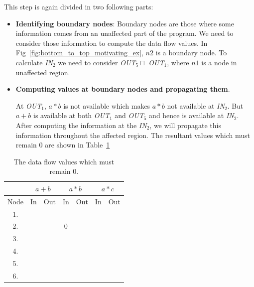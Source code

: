 \documentclass[11pt,a4paper,openright]{report}
\begin{document}
\begin{itemize}
This step is again divided in two following parts:

\begin{itemize}
\item \textbf{Identifying boundary nodes}: Boundary nodes are those where some information comes from an unaffected part of the program. We need to consider 
those information to compute the data flow values. In Fig~\ref{fig:bottom_to_top_motivating_ex}, $n2$ is a boundary node. To calculate \textit{IN}$_2$ we need to consider
\textit{OUT}$_5 \sqcap$ \textit{OUT}$_1$, where $n1$ is a node in unaffected region. 

\item  \textbf{Computing values at boundary nodes and propagating them}.

At \textit{OUT}$_1$, $a*b$ is not available which makes $a*b$ not available at \textit{IN}$_2$. But $a+b$ is available at both \textit{OUT}$_1$ and \textit{OUT}$_5$ and hence is available at \textit{IN}$_2$.
After computing the information at the \textit{IN}$_2$, we will propagate this information throughout the affected region. The resultant values which must remain 0 are shown
in Table~\ref{tab:Available_exp_which_remain_0}
\end{itemize}

\begin{table}[H]
  \begin{center}
    \begin{tabular}{c c c c c c c }
    \hline
       & \multicolumn{2}{c}{$a+b$} & \multicolumn{2}{c}{$a*b$} & \multicolumn{2}{c}{$a*c$} \\
    \hline
      Node & In & Out & In & Out & In & Out\\
   	\midrule
   	  1. &  &  &  &  &  &  \\
   	  2. &  &  &0&  &  &  \\
   	  3. &  &  &  &  &  &  \\
   	  4. &  &  &  &  &  &  \\
   	  5. &  &  &  &  &  &  \\
   	  6. &  &  &  &  &  & \\
      
      \bottomrule 
    \end{tabular}
    \caption{The data flow values which must remain 0.}
      \label{tab:Available_exp_which_remain_0}
  \end{center}
\end{table}

\end{itemize}  
\end{document}
